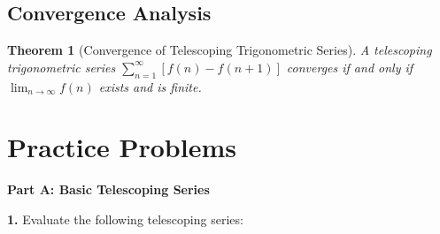 \documentclass[12pt]{article}
\newtheorem{theorem}{Theorem}
\begin{document}
\subsection{Convergence Analysis}

\begin{theorem}[Convergence of Telescoping Trigonometric Series]
A telescoping trigonometric series $\sum_{n=1}^{\infty} [f(n) - f(n+1)]$ converges if and only if $\lim_{n \to \infty} f(n)$ exists and is finite.
\end{theorem}

\newpage

\section{Practice Problems}

\textbf{Part A: Basic Telescoping Series}

\textbf{1.} Evaluate the following telescoping series:
\end{document}
